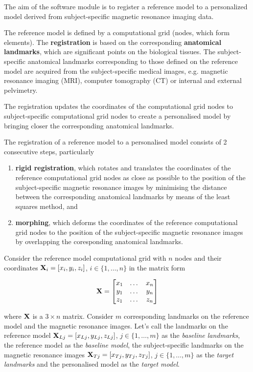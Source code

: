 The aim of the software module is to register a reference model to a personalized model derived from subject-specific magnetic resonance imaging data.

The reference model is defined by a computational grid (nodes, which form elements). The \textbf{registration} is based on the corresponding \textbf{anatomical landmarks}, which are significant points on the biological tissues. The subject-specific anatomical landmarks corresponding to those defined on the reference model are acquired from the subject-specific medical images, e.g. magnetic resonance imaging (MRI), computer tomography (CT) or internal and external pelvimetry.

The registration updates the coordinates of the computational grid nodes to subject-specific computational grid nodes to create a personalised model by bringing closer the corresponding anatomical landmarks.

The registration of a reference model to a personalised model consists of 2 consecutive steps, particularly

\begin{enumerate}
\item \textbf{rigid registration}, which rotates and translates the coordinates of the reference computational grid nodes as close as possible to the position of the subject-specific magnetic resonance images by minimising the distance between the corresponding anatomical landmarks by means of the least squares method, and
\item \textbf{morphing}, which deforms the coordinates of the reference computational grid nodes to the position of the subject-specific magnetic resonance images by overlapping the coresponding anatomical landmarks.
\end{enumerate}

Consider the reference model computational grid with $n$ nodes and their coordinates ${\bf X}_i=\left[x_i,y_i,z_i\right]$, $i\in\{1,\dots,n\}$ in the matrix form

\begin{equation}
{\bf X}=\left[\begin{matrix}
x_1 & \dots & x_n \\
y_1 & \dots & y_n \\
z_1 & \dots & z_n\end{matrix}\right]
\end{equation}

where ${\bf X}$ is a $3\times n$ matrix. Consider $m$ corresponding landmarks on the reference model and the magnetic resonance images. Let's call the landmarks on the reference model ${\bf X}_{Lj}=\left[x_{Lj},y_{Lj},z_{Lj}\right]$, $j\in\{1,\dots,m\}$ as the \textit{baseline landmarks}, the reference model as the \textit{baseline model}, the subject-specific landmarks on the magnetic resonance images ${\bf X}_{Tj}=\left[x_{Tj},y_{Tj},z_{Tj}\right]$, $j\in\{1,\dots,m\}$ as the \textit{target landmarks} and the personalised model as the \textit{target model}.

